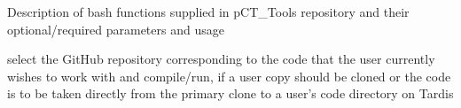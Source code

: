 \begin{tcbenclosure}[type=function, title=bash functions]
\begin{tcbContentsBox}
\tcbsectionheaderfont Description of bash functions supplied in pCT\_Tools repository and their\\ optional/required parameters and usage
\end{tcbContentsBox}
\begin{tcbcode}[type=function, title=add\_rcode\_repo,usagelist={h,u[username],a[git account],r[git repo]}]
    \tcbfunctionsep
\end{tcbcode}
\begin{tcbfunction}[type=function, title=set\_rcode,usagelist={h,G,g,a[git account],r[git repo],b[git branch],u[username]}]
    \tcbfunctiondesc
    {select the GitHub repository corresponding to the code that the user currently wishes to work with and compile/run, if a user copy should be cloned or the code is to be taken directly from the primary clone to a user's code directory on Tardis}
    \tcbfunctionsep

\end{tcbfunction}
\end{tcbenclosure}
